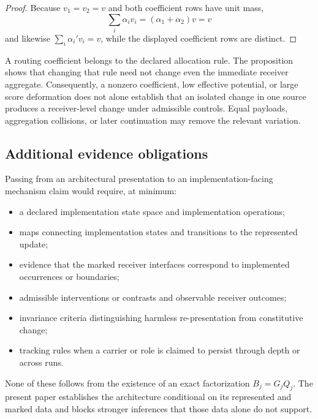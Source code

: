 \begin{proof}
Because $v_1=v_2=v$ and both coefficient rows have unit mass,
\[
\sum_i\alpha_iv_i=(\alpha_1+\alpha_2)v=v
\]
and likewise $\sum_i\alpha_i'v_i=v$, while the displayed coefficient rows are distinct.
\end{proof}

A routing coefficient belongs to the declared allocation rule. The proposition shows that changing that rule need not change even the immediate receiver aggregate. Consequently, a nonzero coefficient, low effective potential, or large score deformation does not alone establish that an isolated change in one source produces a receiver-level change under admissible controls. Equal payloads, aggregation collisions, or later continuation may remove the relevant variation.

\subsection{Additional evidence obligations}

Passing from an architectural presentation to an implementation-facing mechanism claim would require, at minimum:
\begin{itemize}
\item a declared implementation state space and implementation operations;
\item maps connecting implementation states and transitions to the represented update;
\item evidence that the marked receiver interfaces correspond to implemented occurrences or boundaries;
\item admissible interventions or contrasts and observable receiver outcomes;
\item invariance criteria distinguishing harmless re-presentation from constitutive change;
\item tracking rules when a carrier or role is claimed to persist through depth or across runs.
\end{itemize}
None of these follows from the existence of an exact factorization $B_j=G_jQ_j$. The present paper establishes the architecture conditional on its represented and marked data and blocks stronger inferences that those data alone do not support.
